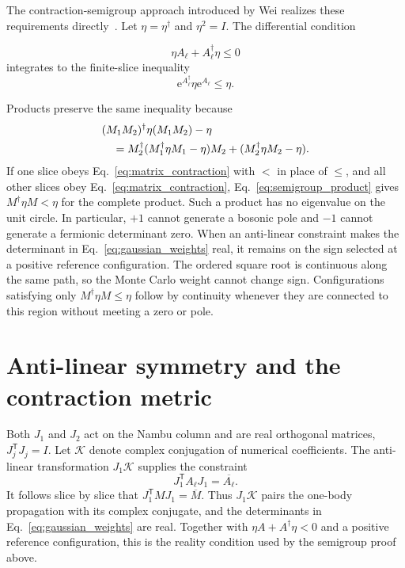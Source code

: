 \documentclass[onecolumn,aps,prb,amsmath,amssymb,superscriptaddress,longbibliography,floatfix]{revtex4-2}
\newcommand{\ee}{\mathrm{e}}
\newcommand{\trans}{\mathsf{T}}
\newcommand{\mc}[1]{\mathcal{#1}}
\begin{document}
The contraction-semigroup approach introduced by Wei realizes these requirements directly~\cite{wei2024prb}.  Let \(\eta=\eta^\dagger\) and \(\eta^2=I\).  The differential condition
\begin{samepage}
\begin{equation}
    \eta A_\ell+A_\ell^\dagger\eta\leq0
    \label{eq:generator_contraction}
\end{equation}
integrates to the finite-slice inequality
\begin{equation}
    \ee^{A_\ell^\dagger}\eta\ee^{A_\ell}\leq\eta .
    \label{eq:matrix_contraction}
\end{equation}
\end{samepage}
Products preserve the same inequality because
\begin{align}
    &(M_1M_2)^\dagger\eta(M_1M_2)-\eta \notag\\
    &\quad=M_2^\dagger(M_1^\dagger\eta M_1-\eta)M_2
      +(M_2^\dagger\eta M_2-\eta).
    \label{eq:semigroup_product}
\end{align}
If one slice obeys Eq.~\eqref{eq:matrix_contraction} with \(<\) in place of \(\leq\), and all other slices obey Eq.~\eqref{eq:matrix_contraction}, Eq.~\eqref{eq:semigroup_product} gives \(M^\dagger\eta M<\eta\) for the complete product.  Such a product has no eigenvalue on the unit circle.  In particular, \(+1\) cannot generate a bosonic pole and \(-1\) cannot generate a fermionic determinant zero.  When an anti-linear constraint makes the determinant in Eq.~\eqref{eq:gaussian_weights} real, it remains on the sign selected at a positive reference configuration.  The ordered square root is continuous along the same path, so the Monte Carlo weight cannot change sign.  Configurations satisfying only \(M^\dagger\eta M\leq\eta\) follow by continuity whenever they are connected to this region without meeting a zero or pole.

\section{Anti-linear symmetry and the contraction metric}

Both \(J_1\) and \(J_2\) act on the Nambu column and are real orthogonal matrices, \(J_j^\trans J_j=I\).  Let \(\mc K\) denote complex conjugation of numerical coefficients.  The anti-linear transformation \(J_1\mc K\) supplies the constraint
\begin{equation}
    J_1^\trans A_\ell J_1=\overline{A_\ell}.
    \label{eq:J1_reality}
\end{equation}
It follows slice by slice that \(J_1^\trans M J_1=\overline M\).  Thus \(J_1\mc K\) pairs the one-body propagation with its complex conjugate, and the determinants in Eq.~\eqref{eq:gaussian_weights} are real.  Together with \(\eta A+A^\dagger\eta<0\) and a positive reference configuration, this is the reality condition used by the semigroup proof above.
\end{document}
